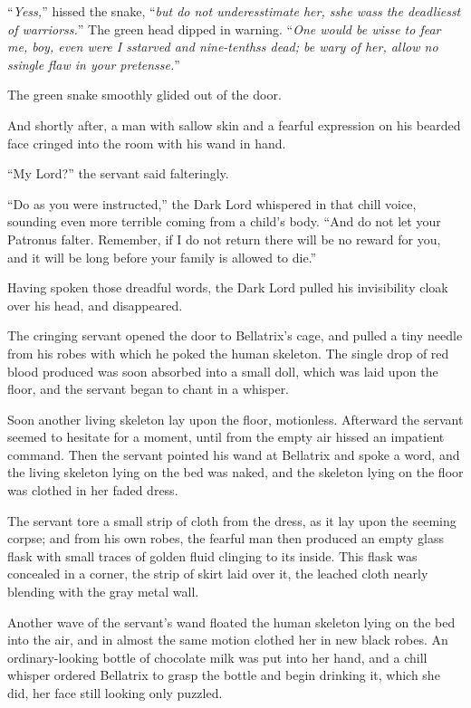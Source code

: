 ``\emph{Yess,}'' hissed the snake, ``\emph{but do not underesstimate her, sshe wass the deadliesst of warriorss.}'' The green head dipped in warning. ``\emph{One would be wisse to fear me, boy, even were I sstarved and nine-tenthss dead; be wary of her, allow no ssingle flaw in your pretensse.}''

The green snake smoothly glided out of the door.

And shortly after, a man with sallow skin and a fearful expression on his bearded face cringed into the room with his wand in hand.

``My Lord?'' the servant said falteringly.

``Do as you were instructed,'' the Dark Lord whispered in that chill voice, sounding even more terrible coming from a child's body. ``And do not let your Patronus falter. Remember, if I do not return there will be no reward for you, and it will be long before your family is allowed to die.''

Having spoken those dreadful words, the Dark Lord pulled his invisibility cloak over his head, and disappeared.

The cringing servant opened the door to Bellatrix's cage, and pulled a tiny needle from his robes with which he poked the human skeleton. The single drop of red blood produced was soon absorbed into a small doll, which was laid upon the floor, and the servant began to chant in a whisper.

Soon another living skeleton lay upon the floor, motionless. Afterward the servant seemed to hesitate for a moment, until from the empty air hissed an impatient command. Then the servant pointed his wand at Bellatrix and spoke a word, and the living skeleton lying on the bed was naked, and the skeleton lying on the floor was clothed in her faded dress.

The servant tore a small strip of cloth from the dress, as it lay upon the seeming corpse; and from his own robes, the fearful man then produced an empty glass flask with small traces of golden fluid clinging to its inside. This flask was concealed in a corner, the strip of skirt laid over it, the leached cloth nearly blending with the gray metal wall.

Another wave of the servant's wand floated the human skeleton lying on the bed into the air, and in almost the same motion clothed her in new black robes. An ordinary-looking bottle of chocolate milk was put into her hand, and a chill whisper ordered Bellatrix to grasp the bottle and begin drinking it, which she did, her face still looking only puzzled.

